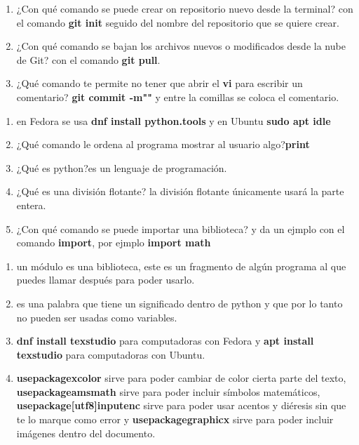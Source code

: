 \documentclass[letterpaper, 12pt, twoside]{article}
\begin{document}
    \title{\Large\color{red}} 
    \begin{enumerate}
    	\item{\Large ¿Con qué comando se puede crear on repositorio nuevo desde la terminal?} con el comando \textbf{git init} seguido del nombre del repositorio que se quiere crear.
    	\item{\Large ¿Con qué comando se bajan los archivos nuevos o modificados desde la nube de Git?} con el comando \textbf{git pull}.
    	\item{\Large ¿Qué comando te permite no tener que abrir el \textbf{vi} para escribir un comentario?} \textbf{git commit -m""} y entre la comillas se coloca el comentario.
    \end{enumerate}

    \title{\Large\color{red}} 
    \begin{enumerate}
     	\item{} en Fedora se usa \textbf{dnf install python.tools} y en Ubuntu \textbf{sudo apt idle}
     	\item{\Large ¿Qué comando le ordena al programa mostrar al usuario algo?}\textbf{print}
     	\item{\Large ¿Qué es python?}es un lenguaje de programación.
     	\item{\Large ¿Qué es una división flotante?} la división flotante únicamente usará la parte entera.
     	\item{\Large ¿Con qué comando se puede importar una biblioteca? y da un ejmplo} con el comando \textbf{import}, por ejmplo \textbf{import math}
    \end{enumerate}

  \title{\Large\color{red}} 
  \begin{enumerate}
    \item{} un módulo es una biblioteca, este es un fragmento de algún programa al que puedes llamar después para poder usarlo.
    	\item{} es una palabra que tiene un significado dentro de python y que por lo tanto no pueden ser usadas como variables.
    	\item{}\textbf{dnf install texstudio} para computadoras con Fedora y \textbf{apt install texstudio} para computadoras con Ubuntu.
    	\item{} \textbf{usepackage{xcolor}} sirve para poder cambiar de color cierta parte del texto, \textbf{usepackage{amsmath}} sirve para poder incluir símbolos matemáticos, \textbf{usepackage[utf8]{inputenc}} sirve para poder usar acentos y diéresis sin que te lo marque como error y \textbf{usepackage{graphicx}} sirve para poder incluir imágenes dentro del documento.
    	
    \end{enumerate}
\end{document}

